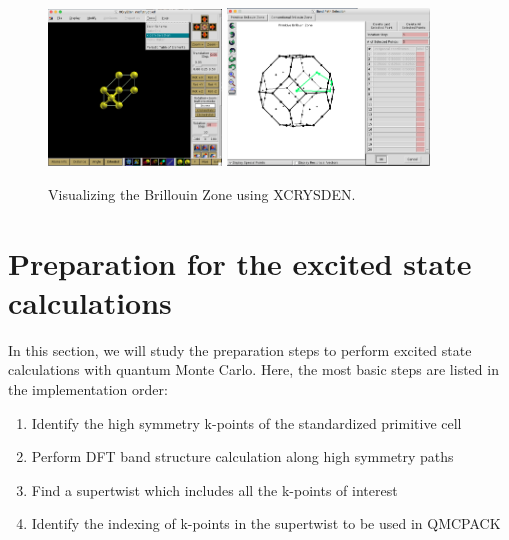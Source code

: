 \begin{figure}
	\hfill
	\includegraphics[width=0.41\textwidth]{./figures/lab_excited_xcrysden1}
	\includegraphics[width=0.48\textwidth]{./figures/lab_excited_xcrysden2}
	\hfill
	\caption{Visualizing the Brillouin Zone using XCRYSDEN.}
	\label{fig:lab_ex_xcrysden}
\end{figure}


\section{Preparation for the excited state calculations}\label{sec:lab_ex_prep}

In this section, we will study the preparation steps to perform excited state calculations with quantum Monte Carlo. 
Here, the most basic steps are listed in the implementation order:
\begin{enumerate}
	\item Identify the high symmetry k-points of the standardized primitive cell 
	\item Perform DFT band structure calculation along high symmetry paths
	\item Find a supertwist which includes all the k-points of interest
	\item Identify the indexing of k-points in the supertwist to be used in QMCPACK
\end{enumerate}

